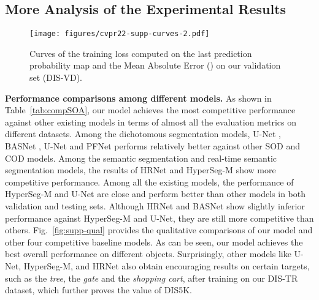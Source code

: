 \documentclass[10pt,twocolumn,letterpaper]{article}
\begin{document}
\subsection{More Analysis of the Experimental Results}










\begin{figure*}[thbp]
    \centering
    \texttt{[image: figures/cvpr22-supp-curves-2.pdf]}
\caption{\small Curves of the training loss computed on the last prediction probability map and the Mean Absolute Error () on our validation set (DIS-VD).}
    \label{fig:tm_curves}
\end{figure*}

\noindent 
\textbf{Performance comparisons among different models.} 
As shown in Table~\ref{tab:compSOA}, our model achieves the most competitive performance against other existing models in terms of almost all the evaluation metrics on different datasets. 
Among the dichotomous segmentation models, U-Net \cite{ronneberger2015u}, BASNet \cite{qin2019basnet}, U-Net \cite{qin2020u2} and PFNet \cite{Mei_2021_CVPR} performs relatively better against other SOD and COD models. 
Among the semantic segmentation and real-time semantic segmentation models, the results of HRNet \cite{WangSCJDZLMTWLX19} and HyperSeg-M \cite{nirkin2020hyperseg} show more competitive performance. 
Among all the existing models, the performance of HyperSeg-M and U-Net are close and perform better than other models in both validation and testing sets. Although HRNet and BASNet show slightly inferior performance against HyperSeg-M and U-Net, they are still more competitive than others. 
Fig.~\ref{fig:supp-qual} provides the qualitative comparisons of our model and other four competitive baseline models. As can be seen, our model achieves the best overall performance on different objects. Surprisingly, other models like U-Net, HyperSeg-M, and HRNet also obtain encouraging results on certain targets, such as the \textit{tree}, the \textit{gate} and the \textit{shopping cart}, after training on our DIS-TR dataset, which further proves the value of DIS5K. 
\end{document}

